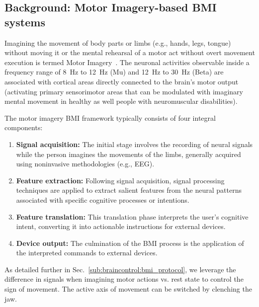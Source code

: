 \subsection{Background: Motor Imagery-based BMI systems}\label{sub:braincontrol:motor_imagery_bmi}

Imagining the movement of body parts or limbs (e.g., hands, legs, tongue) without moving it or the mental rehearsal of a motor act without overt movement execution is termed Motor Imagery~\citep{lotze2006motor}.  The neuronal activities observable inside a frequency range of \SI{8}{Hz} to \SI{12}{Hz} (Mu) and \SI{12}{Hz} to \SI{30}{Hz} (Beta) are associated with cortical areas directly connected to the brain’s motor output (activating primary sensorimotor areas that can be modulated with imaginary mental movement in healthy as well people with neuromuscular disabilities). 

The motor imagery \gls{BMI} framework typically consists of four integral components:

\begin{enumerate}
    \item \textbf{Signal acquisition:} The initial stage involves the recording of neural signals while the person imagines the movements of the limbs, generally acquired using noninvasive methodologies (e.g., \gls{EEG}).
    \item \textbf{Feature extraction:} Following signal acquisition, signal processing techniques are applied to extract salient features from the neural patterns associated with specific cognitive processes or intentions.
    \item \textbf{Feature translation:} This translation phase interprets the user's cognitive intent, converting it into actionable instructions for external devices.
    \item \textbf{Device output:} The culmination of the \gls{BMI} process is the application of the interpreted commands to external devices. 
\end{enumerate}

As detailed further in Sec.~\ref{sub:braincontrol:bmi_protocol}, we leverage the difference in signals when imagining motor actions vs. rest state to control the sign of movement. The active axis of movement can be switched by clenching the jaw. %

